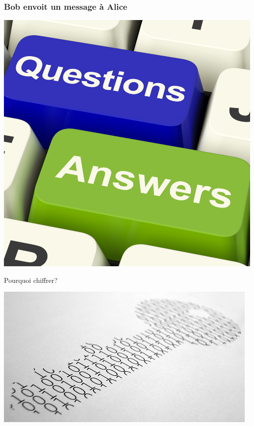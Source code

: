 \begin{frame}
\frametitle{Bob envoit un message à Alice}
\begin{center}
\includegraphics[scale=0.4] {./materials/questions.jpg} 
\end{center}
\end{frame}


\begin{frame}
\Huge{\centerline{Pourquoi chiffrer?}}
\begin{center}
\includegraphics[scale=0.4] {./materials/cryptography.jpg} 
\end{center}
\end{frame}

